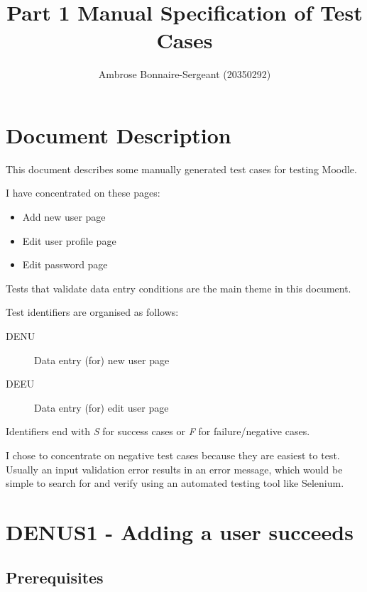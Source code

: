 \documentclass{article}
\title{Part 1 Manual Specification of Test Cases}
\author{Ambrose Bonnaire-Sergeant (20350292)}
\begin{document}
\maketitle


\tableofcontents

\section{Document Description}

This document describes some manually generated test cases for testing
Moodle.

I have concentrated on these pages:

\begin{itemize}
  \item Add new user page
  \item Edit user profile page
  \item Edit password page
\end{itemize}

Tests that validate data entry conditions are the main theme in this document.

Test identifiers are organised as follows:

\begin{description}
  \item[DENU] Data entry (for) new user page
  \item[DEEU] Data entry (for) edit user page
\end{description}

Identifiers end with \emph{S} for success cases or \emph{F} for
failure/negative cases.

I chose to concentrate on negative test cases because they are easiest
to test. Usually an input validation error results in an error message,
which would be simple to search for and verify using an automated
testing tool like Selenium.


\section*{DENUS1 - Adding a user succeeds}

\subsection*{Prerequisites}
\end{document}
